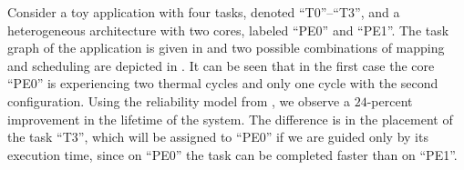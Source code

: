 Consider a toy application with four tasks, denoted ``T0''--``T3'', and a heterogeneous architecture with two cores, labeled ``PE0'' and ``PE1''. The task graph of the application is given in  and two possible combinations of mapping and scheduling are depicted in . It can be seen that in the first case the core ``PE0'' is experiencing two thermal cycles and only one cycle with the second configuration. Using the reliability model from , we observe a $24$-percent improvement in the lifetime of the system. The difference is in the placement of the task ``T3'', which will be assigned to ``PE0'' if we are guided only by its execution time, since on ``PE0'' the task can be completed faster than on ``PE1''.
